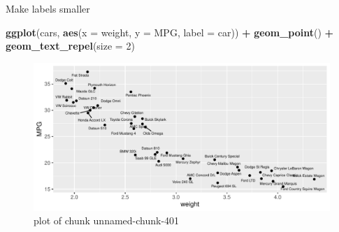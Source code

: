 \documentclass[ignorenonframetext,]{beamer}
\newenvironment{Shaded}{\begin{snugshade}}{\end{snugshade}}
\newcommand{\DataTypeTok}[1]{\textcolor[rgb]{0.13,0.29,0.53}{#1}}
\newcommand{\DecValTok}[1]{\textcolor[rgb]{0.00,0.00,0.81}{#1}}
\newcommand{\KeywordTok}[1]{\textcolor[rgb]{0.13,0.29,0.53}{\textbf{#1}}}
\newcommand{\NormalTok}[1]{#1}
\newcommand{\OperatorTok}[1]{\textcolor[rgb]{0.81,0.36,0.00}{\textbf{#1}}}
\newcommand{\StringTok}[1]{\textcolor[rgb]{0.31,0.60,0.02}{#1}}
\begin{document}
\begin{frame}[fragile]{Make labels smaller}
\protect\hypertarget{make-labels-smaller}{}

\begin{Shaded}
\begin{Highlighting}[]
\KeywordTok{ggplot}\NormalTok{(cars, }\KeywordTok{aes}\NormalTok{(}\DataTypeTok{x =}\NormalTok{ weight, }\DataTypeTok{y =}\NormalTok{ MPG, }\DataTypeTok{label =}\NormalTok{ car)) }\OperatorTok{+}
\StringTok{  }\KeywordTok{geom_point}\NormalTok{() }\OperatorTok{+}\StringTok{ }\KeywordTok{geom_text_repel}\NormalTok{(}\DataTypeTok{size =} \DecValTok{2}\NormalTok{)}
\end{Highlighting}
\end{Shaded}

\begin{figure}
\centering
\includegraphics{figure/unnamed-chunk-401-1.pdf}
\caption{plot of chunk unnamed-chunk-401}
\end{figure}

\end{frame}
\end{document}
